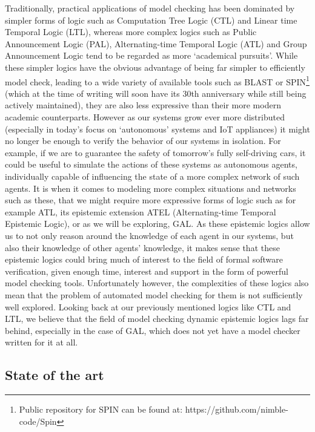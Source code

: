 Traditionally, practical applications of model checking has been dominated by simpler forms of logic such as Computation Tree Logic\cite{clarke1981design} (CTL) and Linear time Temporal Logic\cite{Pnueli1977_LTL} (LTL), whereas more complex logics such as Public Announcement Logic\cite{Plaza2007_PAL} (PAL), Alternating-time Temporal Logic\cite{ATL} (ATL) and Group Announcement Logic tend to be regarded as more `academical pursuits'. While these simpler logics have the obvious advantage of being far simpler to efficiently model check, leading to a wide variety of available tools such as BLAST\cite{BLAST} or SPIN\footnote{Public repository for SPIN can be found at: https://github.com/nimble-code/Spin}\cite{SPIN} (which at the time of writing will soon have its 30th anniversary while still being actively maintained), they are also less expressive than their more modern academic counterparts. However as our systems grow ever more distributed (especially in today's focus on `autonomous' systems and IoT appliances) it might no longer be enough to verify the behavior of our systems in isolation. For example, if we are to guarantee the safety of tomorrow's fully self-driving cars, it could be useful to simulate the actions of these systems as autonomous agents, individually capable of influencing the state of a more complex network of such agents. It is when it comes to modeling more complex situations and networks such as these, that we might require more expressive forms of logic such as for example ATL, its epistemic extension ATEL\cite{ATEL} (Alternating-time Temporal Epistemic Logic), or as we will be exploring, GAL. As these epistemic logics allow us to not only reason around the knowledge of each agent in our systems, but also their knowledge of other agents' knowledge, it makes sense that these epistemic logics could bring much of interest to the field of formal software verification, given enough time, interest and support in the form of powerful model checking tools. Unfortunately however, the complexities of these logics also mean that the problem of automated model checking for them is not sufficiently well explored. Looking back at our previously mentioned logics like CTL and LTL, we believe that the field of model checking dynamic epistemic logics lags far behind, especially in the case of GAL, which does not yet have a model checker written for it at all. 

\subsection{State of the art}

